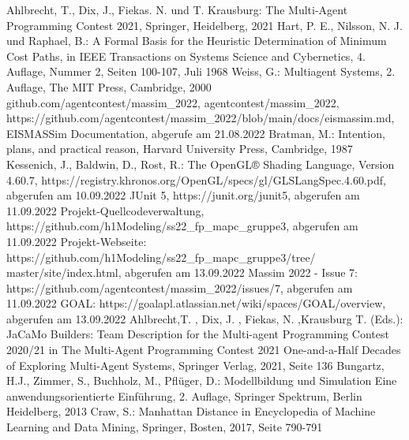 \documentclass[runningheads]{llncs}
\begin{document}
%
%
%
% 
% 
%
\begin{thebibliography}{8}
	Ahlbrecht, T., Dix, J., Fiekas. N. und T. Krausburg: The Multi-Agent Programming Contest 2021, Springer, Heidelberg, 2021
	Hart, P. E., Nilsson, N. J. und Raphael, B.: A Formal Basis for the Heuristic Determination of Minimum Cost Paths, in IEEE Transactions on Systems Science and Cybernetics, 4. Auflage, Nummer 2, Seiten 100-107, Juli 1968
	Weiss, G.: Multiagent Systems, 2. Auflage, The MIT Press, Cambridge, 2000
	github.com/agentcontest/massim\_2022, agentcontest/massim\_2022, \\ https://github.com/agentcontest/massim\_2022/blob/main/docs/eismassim.md, EISMASSim Documentation, abgerufe am 21.08.2022
	Bratman, M.: Intention, plans, and practical reason, Harvard University Press, Cambridge, 1987
	Kessenich, J., Baldwin, D., Rost, R.: The OpenGL® Shading Language, Version 4.60.7, https://registry.khronos.org/OpenGL/specs/gl/GLSLangSpec.4.60.pdf, abgerufen am 10.09.2022
	JUnit 5, https://junit.org/junit5, abgerufen am 11.09.2022
	Projekt-Quellcodeverwaltung, https://github.com/h1Modeling/ss22\_fp\_mapc\_gruppe3, abgerufen am 11.09.2022
	Projekt-Webseite: https://github.com/h1Modeling/ss22\_fp\_mapc\_gruppe3/tree/ master/site/index.html, abgerufen am 13.09.2022
	Massim 2022 - Issue 7: https://github.com/agentcontest/massim\_2022/issues/7, abgerufen am 11.09.2022
	GOAL: https://goalapl.atlassian.net/wiki/spaces/GOAL/overview, abgerufen am 13.09.2022
	Ahlbrecht,T. , Dix, J. , Fiekas, N. ,Krausburg T. (Eds.): JaCaMo Builders: Team Description for the Multi-agent Programming Contest 2020/21  in The Multi-Agent Programming Contest 2021 One-and-a-Half Decades of Exploring Multi-Agent Systems, Springer Verlag, 2021, Seite 136
	Bungartz, H.J., Zimmer, S., Buchholz, M., Pflüger, D.: Modellbildung und Simulation Eine anwendungsorientierte Einführung, 2. Auflage, Springer Spektrum, Berlin Heidelberg, 2013
Craw, S.: Manhattan Distance in Encyclopedia of Machine Learning and Data Mining, Springer, Bosten, 2017, Seite 790-791	
\end{thebibliography}
\end{document}
